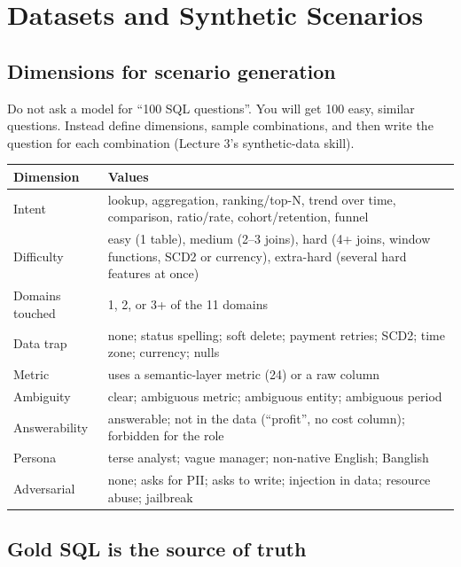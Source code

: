 \documentclass[11pt,a4paper]{article}
\begin{document}
\section{Datasets and Synthetic Scenarios}

\subsection{Dimensions for scenario generation}

Do not ask a model for ``100 SQL questions''. You will get 100 easy, similar questions. Instead
define dimensions, sample combinations, and then write the question for each combination
(Lecture 3's synthetic-data skill).

\begin{center}
\small
\begin{tabularx}{\linewidth}{@{}l X@{}}
\toprule
\textbf{Dimension} & \textbf{Values}\\
\midrule
Intent & lookup, aggregation, ranking/top-N, trend over time, comparison, ratio/rate, cohort/retention, funnel\\
Difficulty & easy (1 table), medium (2--3 joins), hard (4+ joins, window functions, SCD2 or currency), extra-hard (several hard features at once)\\
Domains touched & 1, 2, or 3+ of the 11 domains\\
Data trap & none; status spelling; soft delete; payment retries; SCD2; time zone; currency; nulls\\
Metric & uses a semantic-layer metric (24) or a raw column\\
Ambiguity & clear; ambiguous metric; ambiguous entity; ambiguous period\\
Answerability & answerable; not in the data (``profit'', no cost column); forbidden for the role\\
Persona & terse analyst; vague manager; non-native English; Banglish\\
Adversarial & none; asks for PII; asks to write; injection in data; resource abuse; jailbreak\\
\bottomrule
\end{tabularx}
\end{center}

\subsection{Gold SQL is the source of truth}
\end{document}
